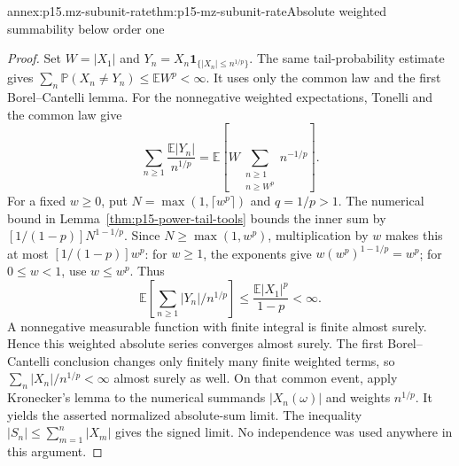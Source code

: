 \begin{annexitem}{annex:p15.mz-subunit-rate}{thm:p15-mz-subunit-rate}{Absolute weighted summability below order one}
\begin{proof}
Set \(W=|X_1|\) and \(Y_n=X_n\mathbf1_{\{|X_n|\leq n^{1/p}\}}\).
The same tail-probability estimate gives
\(\sum_n\mathbb P(X_n\ne Y_n)\leq\mathbb EW^p<\infty\).
It uses only the common law and the first Borel--Cantelli lemma.
For the nonnegative weighted expectations, Tonelli and the common
law give
\[
 \sum_{n\geq1}\frac{\mathbb E|Y_n|}{n^{1/p}}
    =\mathbb E\!\left[
       W\sum_{\substack{n\geq1\\ n\geq W^p}}n^{-1/p}\right].
\]
For a fixed \(w\geq0\), put \(N=\max(1,\lceil w^p\rceil)\)
and \(q=1/p>1\). The numerical bound in
Lemma~\ref{thm:p15-power-tail-tools} bounds the inner sum by
\([1/(1-p)]N^{1-1/p}\).
Since \(N\geq\max(1,w^p)\), multiplication by \(w\) makes this
at most \([1/(1-p)]w^p\): for \(w\geq1\), the exponents give
\(w(w^p)^{1-1/p}=w^p\); for \(0\leq w<1\), use \(w\leq w^p\).
Thus
\[
 \mathbb E\!\left[\sum_{n\geq1}|Y_n|/n^{1/p}\right]
                  \leq\frac{\mathbb E|X_1|^p}{1-p}<\infty.
\]
A nonnegative measurable function with finite integral is finite
almost surely. Hence this weighted absolute series converges almost
surely. The first Borel--Cantelli conclusion changes only finitely
many finite weighted terms, so \(\sum_n|X_n|/n^{1/p}<\infty\)
almost surely as well. On that common event, apply Kronecker's lemma
to the numerical summands \(|X_n(\omega)|\) and weights \(n^{1/p}\).
It yields the asserted normalized absolute-sum limit. The inequality
\(|S_n|\leq\sum_{m=1}^n|X_m|\) gives the signed limit. No
independence was used anywhere in this argument.
\end{proof}
\end{annexitem}

